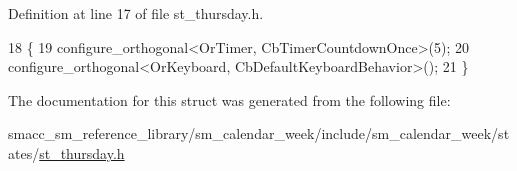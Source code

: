 Definition at line 17 of file st\+\_\+thursday.\+h.


\begin{DoxyCode}
18     \{
19         configure\_orthogonal<OrTimer,  CbTimerCountdownOnce>(5);    
20         configure\_orthogonal<OrKeyboard, CbDefaultKeyboardBehavior>();
21     \}
\end{DoxyCode}


The documentation for this struct was generated from the following file\+:\begin{DoxyCompactItemize}
\item 
smacc\+\_\+sm\+\_\+reference\+\_\+library/sm\+\_\+calendar\+\_\+week/include/sm\+\_\+calendar\+\_\+week/states/\hyperlink{sm__calendar__week_2include_2sm__calendar__week_2states_2st__thursday_8h}{st\+\_\+thursday.\+h}\end{DoxyCompactItemize}
